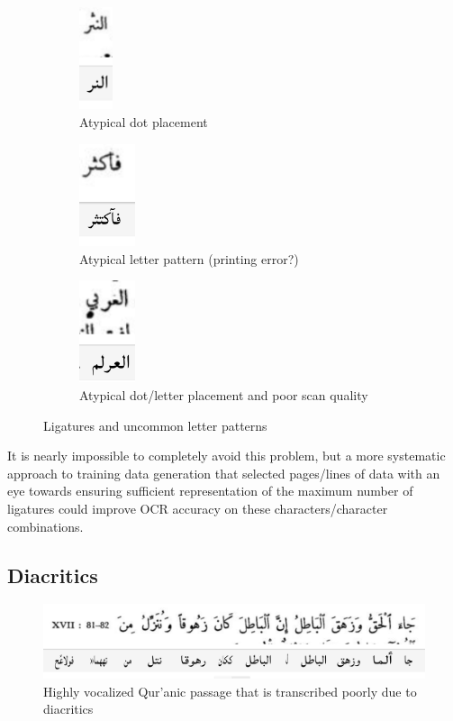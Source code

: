 \begin{figure}[!ht]
	\begin{subfigure}[t]{0.3\linewidth}
	\centering
		\includegraphics[height=3cm]{images/image26.png}
	\caption{Atypical dot placement}
	\label{fig3:fig12}
	\end{subfigure}
	\begin{subfigure}[t]{0.3\linewidth}
	\centering
	\includegraphics[height=3cm]{images/image24.png}
	\caption{Atypical letter pattern (printing error?)}
	\label{fig3:fig13}
	\end{subfigure}
	\begin{subfigure}[t]{0.3\linewidth}
	\centering
	\includegraphics[height=3cm]{images/image25.png}
	\caption{Atypical dot/letter placement and poor scan quality}
	\label{fig3:fig14}
	\end{subfigure}
	\caption{Ligatures and uncommon letter patterns}
	\label{fig3:fig914}
\end{figure}

It is nearly impossible to completely avoid this problem, but a more systematic
approach to training data generation that selected pages/lines of data with an
eye towards ensuring sufficient representation of the maximum number of
ligatures could improve OCR accuracy on these characters/character
combinations.

\subsection{Diacritics}

\begin{figure}[!ht]
	\centering
	\includegraphics[width=\textwidth]{images/image27.png}
	\caption{Highly vocalized Qur’anic passage that is transcribed poorly due to diacritics}
  	\label{fig3:fig15}
\end{figure}

